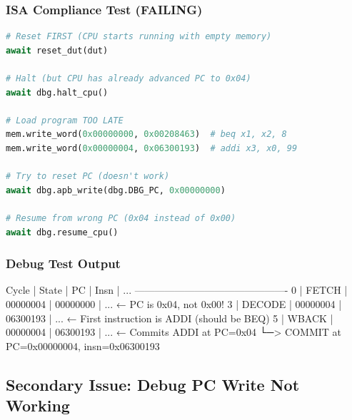 \subsubsection{ISA Compliance Test (FAILING)}\label{cr:fix:rtl-isa-test-fix:isa-compliance-test-failing}

\begin{record}

\begin{lstlisting}[language=Python]
# Reset FIRST (CPU starts running with empty memory)
await reset_dut(dut)

# Halt (but CPU has already advanced PC to 0x04)
await dbg.halt_cpu()

# Load program TOO LATE
mem.write_word(0x00000000, 0x00208463)  # beq x1, x2, 8
mem.write_word(0x00000004, 0x06300193)  # addi x3, x0, 99

# Try to reset PC (doesn't work)
await dbg.apb_write(dbg.DBG_PC, 0x00000000)

# Resume from wrong PC (0x04 instead of 0x00)
await dbg.resume_cpu()
\end{lstlisting}

\end{record}

\subsubsection{Debug Test Output}\label{cr:fix:rtl-isa-test-fix:debug-test-output}

\begin{record}

\begin{textblock}
Cycle | State   | PC       | Insn       | ...
----------------------------------------------
    0 | FETCH   | 00000004 | 00000000 | ...  ← PC is 0x04, not 0x00!
    3 | DECODE  | 00000004 | 06300193 | ...  ← First instruction is ADDI (should be BEQ)
    5 | WBACK   | 00000004 | 06300193 | ...  ← Commits ADDI at PC=0x04
      └─> COMMIT at PC=0x00000004, insn=0x06300193
\end{textblock}

\end{record}

\subsection{Secondary Issue: Debug PC Write Not Working}\label{cr:fix:rtl-isa-test-fix:secondary-issue-debug-pc-write-not-working}

